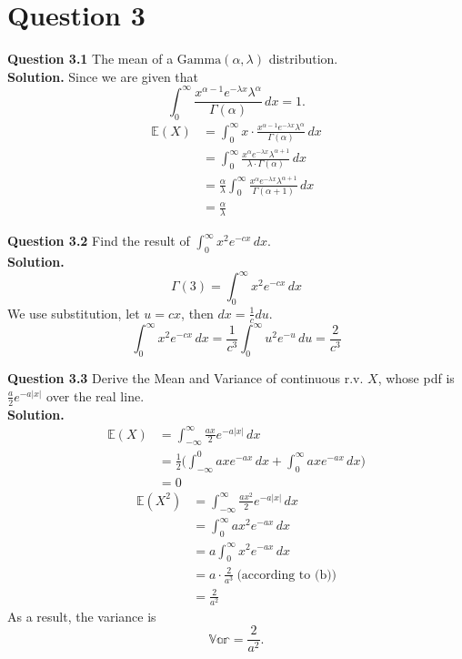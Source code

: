 \documentclass[
]{book}
\begin{document}
\section{Question 3}\label{question-3-2}

\textbf{Question 3.1} The mean of a \(\text{Gamma}(\alpha, \lambda)\) distribution.\\
\textbf{Solution.} Since we are given that
\[\int_{0}^{\infty} \frac{x^{\alpha-1} e^{-\lambda x} \lambda^\alpha}{\Gamma(\alpha)} \,dx = 1.\]
\[\begin{aligned}
\mathbb{E}(X) &= \int_{0}^{\infty} x \cdot \frac{x^{\alpha-1}e^{-\lambda x} \lambda^\alpha}{\Gamma(\alpha)} \,dx \\
&= \int_{0}^{\infty} \frac{x^{\alpha}e^{-\lambda x} \lambda^{\alpha+1}}{\lambda \cdot \Gamma(\alpha)} \,dx \\
&= \frac{\alpha}{\lambda} \int_{0}^{\infty}  \frac{x^{\alpha} e^{-\lambda x} \lambda^{\alpha+1}}{\Gamma(\alpha+1)} \,dx \\
&= \frac{\alpha}{\lambda}
\end{aligned}\]

\textbf{Question 3.2} Find the result of \(\int_0^{\infty} x^2 e^{-cx} \,dx\).\\
\textbf{Solution.} \[\Gamma(3) = \int_0^{\infty} x^2 e^{-cx} \,dx\]
We use substitution, let \(u = cx\), then \(dx = \frac{1}{c}du\).
\[\int_0^{\infty} x^2 e^{-cx} \,dx = \frac{1}{c^3} \int_{0}^{\infty} u^2 e^{-u} \,du = \frac{2}{c^3}\]

\textbf{Question 3.3} Derive the Mean and Variance of continuous r.v. \(X\), whose pdf is \(\frac{a}{2}e^{-a|x|}\) over the real line.\\
\textbf{Solution.}\\
\[\begin{aligned}
\mathbb{E}(X) &= \int_{-\infty}^{\infty} \frac{ax}{2}e^{-a|x|} \,dx \\
&= \frac{1}{2} \bigg(\int_{-\infty}^{0} axe^{-ax} \,dx + \int_{0}^{\infty} axe^{-ax} \,dx \bigg) \\
&= 0
\end{aligned}\]
\[\begin{aligned}
\mathbb{E}(X^2) &= \int_{-\infty}^{\infty} \frac{ax^2}{2}e^{-a|x|} \,dx \\
&= \int_{0}^{\infty} ax^2e^{-ax} \,dx \\
&= a \int_{0}^{\infty} x^2 e^{-ax} \,dx \\
&= a \cdot \frac{2}{a^3} \ \text{(according to (b))} \\
&= \frac{2}{a^2}
\end{aligned}\]
As a result, the variance is \[\mathbb{Var} = \frac{2}{a^2}.\]
\end{document}
